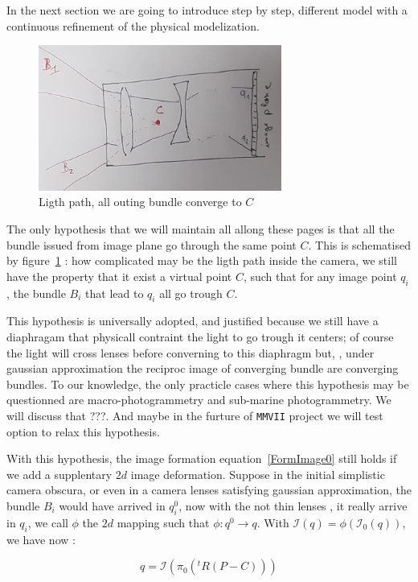 In the next section we are going to introduce step by step, different model with a continuous
refinement of the physical modelization.  

\begin{figure}
\centering
	\includegraphics[width=8cm]{Methods/Images/CamPersp.jpg}
	\caption{Ligth path, all outing bundle converge to $C$}
	\label{fig:CamPerspScheme}
\end{figure}

The only hypothesis that we will maintain all allong these pages is that all the bundle issued from image
plane go through the same point $C$. This is schematised by figure~\ref{fig:CamPerspScheme} :
how complicated may be the ligth path inside the camera, we still have the property that
it exist a virtual point $C$, such that for any image point $q_i$, the bundle $B_i$ that lead to $q_i$
all go trough $C$.

This hypothesis is universally adopted, and justified because we still have a diaphragam that physicall contraint
the light to go trough it centers; of course the light will cross lenses before converning to this diaphragm but, 
, under gaussian approximation the reciproc image of converging bundle are converging bundles.
To our knowledge, the only practicle cases where this hypothesis may be questionned are macro-photogrammetry and
sub-marine photogrammetry. We will discuss that ???. And maybe in the furture of {\tt MMVII} project we will 
test option to relax this hypothesis.

With this hypothesis, the image formation equation~\ref{FormImage0} still holds if
we add a supplentary $2d$ image deformation. Suppose in the initial simplistic camera
obscura, or even in a camera lenses satisfying gaussian approximation, 
the bundle $B_i$ would have arrived in $q^0_i$, now with the not thin lenses ,
it really arrive in $q_i$, we call $\phi$ the $2d$ mapping such that $\phi : q^0 \rightarrow q$.
With $ \mathcal{I}(q) = \phi (\mathcal{I}_0(q))  $, we have now :


\begin{equation}
	q  =   \mathcal{I} (\pi_0 (^t R (P - C)))
\end{equation}

